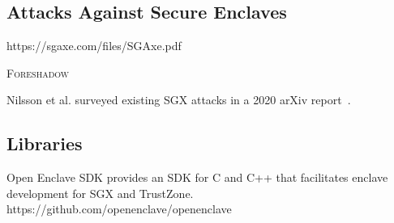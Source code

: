 \subsection{Attacks Against Secure Enclaves}

https://sgaxe.com/files/SGAxe.pdf

\textsc{Foreshadow}~\cite{Bulck18a}
\cite{Bulck19a}


Nilsson et al. surveyed existing SGX attacks in a 2020 arXiv report~\cite{Nilsson20a}.

\subsection{Libraries}

Open Enclave SDK provides an SDK for C and C++ that facilitates enclave development for SGX and TrustZone.
https://github.com/openenclave/openenclave